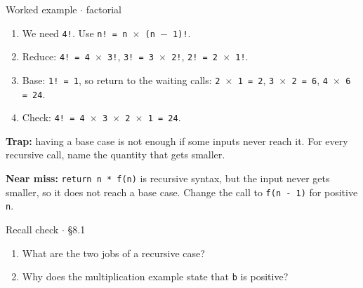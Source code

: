 \documentclass[11pt]{article}
\begin{document}
\begin{keepsection}
\begin{workedbox}{Worked example \ensuremath{\cdot} factorial}
\begin{enumerate}
\item We need \texttt{4!}. Use \texttt{n! = n \ensuremath{\times} (n \ensuremath{-} 1)!}.
\item Reduce: \texttt{4! = 4 \ensuremath{\times} 3!}, \texttt{3! = 3 \ensuremath{\times} 2!}, \texttt{2! = 2 \ensuremath{\times} 1!}.
\item Base: \texttt{1! = 1}, so return to the waiting calls: \texttt{2 \ensuremath{\times} 1 = 2}, \texttt{3 \ensuremath{\times} 2 = 6}, \texttt{4 \ensuremath{\times} 6 = 24}.
\item Check: \texttt{4! = 4 \ensuremath{\times} 3 \ensuremath{\times} 2 \ensuremath{\times} 1 = 24}.
\end{enumerate}
\end{workedbox}

\begin{notebox}\textbf{Trap:} having a base case is not enough if some inputs never reach it. For every recursive call, name the quantity that gets smaller.\end{notebox}

\begin{notebox}\textbf{Near miss:} \texttt{return n * f(n)} is recursive syntax, but the input never gets smaller, so it does not reach a base case. Change the call to \texttt{f(n - 1)} for positive \texttt{n}.\end{notebox}

\begin{recallbox}{Recall check \ensuremath{\cdot} §8.1}
\begin{enumerate}
\item What are the two jobs of a recursive case?
\item Why does the multiplication example state that \texttt{b} is positive?
\end{enumerate}

\end{recallbox}
\end{keepsection}
\end{document}
